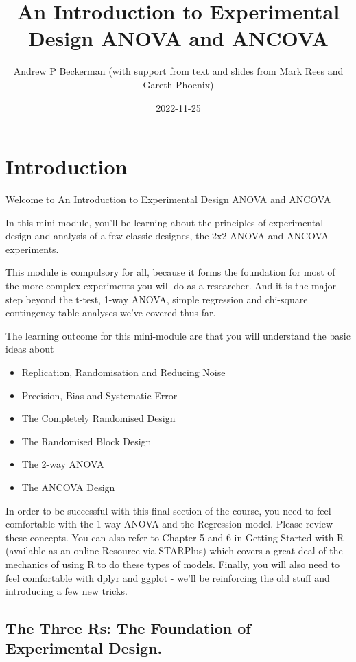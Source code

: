 \documentclass[
]{book}
\title{An Introduction to Experimental Design ANOVA and ANCOVA}
\author{Andrew P Beckerman (with support from text and slides from Mark Rees and Gareth Phoenix)}
\date{2022-11-25}
\providecommand{\tightlist}{%
  \setlength{\itemsep}{0pt}\setlength{\parskip}{0pt}}
\begin{document}
\maketitle

{
\setcounter{tocdepth}{1}
\tableofcontents
}
\hypertarget{introduction}{%
\chapter{Introduction}\label{introduction}}

Welcome to An Introduction to Experimental Design ANOVA and ANCOVA

In this mini-module, you'll be learning about the principles of experimental design and analysis of a few classic designes, the 2x2 ANOVA and ANCOVA experiments.

This module is compulsory for all, because it forms the foundation for most of the more complex experiments you will do as a researcher. And it is the major step beyond the t-test, 1-way ANOVA, simple regression and chi-square contingency table analyses we've covered thus far.

The learning outcome for this mini-module are that you will understand the basic ideas about

\begin{itemize}
\tightlist
\item
  Replication, Randomisation and Reducing Noise
\item
  Precision, Bias and Systematic Error
\item
  The Completely Randomised Design
\item
  The Randomised Block Design
\item
  The 2-way ANOVA
\item
  The ANCOVA Design
\end{itemize}

In order to be successful with this final section of the course, you need to feel comfortable with the 1-way ANOVA and the Regression model. Please review these concepts. You can also refer to Chapter 5 and 6 in Getting Started with R (available as an online Resource via STARPlus) which covers a great deal of the mechanics of using R to do these types of models. Finally, you will also need to feel comfortable with dplyr and ggplot - we'll be reinforcing the old stuff and introducing a few new tricks.

\hypertarget{the-three-rs-the-foundation-of-experimental-design.}{%
\section{The Three Rs: The Foundation of Experimental Design.}\label{the-three-rs-the-foundation-of-experimental-design.}}
\end{document}
